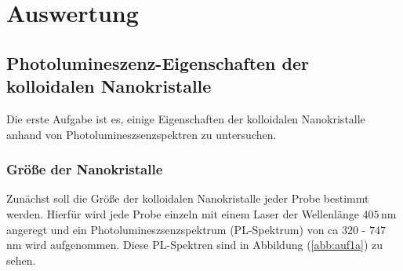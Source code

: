 \section{Auswertung}
\subsection{Photolumineszenz-Eigenschaften der kolloidalen Nanokristalle}
Die erste Aufgabe ist es, einige Eigenschaften der kolloidalen Nanokristalle anhand von Photolumineszsenzspektren zu untersuchen.
\subsubsection{ Gr\"{o}{\ss}e der Nanokristalle}
Zun\"{a}chst soll die Gr\"{o}{\ss}e der kolloidalen Nanokristalle jeder Probe bestimmt werden.
Hierf\"{u}r wird jede Probe einzeln mit einem Laser der Wellenl\"{a}nge $405 \,$nm angeregt und ein Photolumineszsenzspektrum (PL-Spektrum) von ca $320$ - $747 \,$nm wird aufgenommen.
Diese PL-Spektren sind in Abbildung (\ref{abb:auf1a}) zu sehen. 
